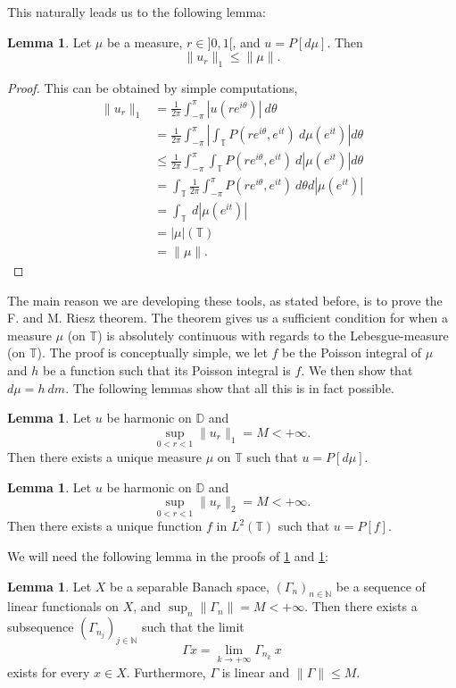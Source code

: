 \documentclass[a4paper,12pt,twoside,BCOR=10mm]{scrbook}
\theoremstyle{definition}
\theoremstyle{definition}
\newtheorem{lemma}[theorem]{Lemma}
\theoremstyle{definition}
\begin{document}
This naturally leads us to the following lemma:
\begin{lemma}
\label{FMRlemma1}
Let $\mu$ be a measure, $r \in ]0, 1[$, and $u = P[d\mu]$.
Then
\[
	\|u_r\|_1 \leq \|\mu\|.
\]
\end{lemma}
\begin{proof}
This can be obtained by simple computations,
\begin{align*}
	\|u_r\|_1
	&= \frac{1}{2\pi} \int_{-\pi}^{\pi} |u(re^{i\theta})|\ d\theta\\
	&= \frac{1}{2\pi} \int_{-\pi}^{\pi} \left | \int_{\mathbb{T}} P(re^{i\theta}, e^{it})\ d\mu(e^{it}) \right | d\theta\\
	&\leq \frac{1}{2\pi} \int_{-\pi}^{\pi} \int_{\mathbb{T}} P(re^{i\theta}, e^{it})\ d|\mu(e^{it})| d\theta\\
	&= \int_{\mathbb{T}} \frac{1}{2\pi} \int_{-\pi}^{\pi} P(re^{i\theta}, e^{it})\ d\theta d|\mu(e^{it})|\\ 
	&= \int_{\mathbb{T}}\ d|\mu(e^{it})|\\
	&= |\mu|(\mathbb{T})\\
	&= \|\mu\|.
\end{align*}
\end{proof}
The main reason we are developing these tools, as stated before, is to prove the F. and M. Riesz theorem.
The theorem gives us a sufficient condition for when a measure $\mu$ (on $\mathbb{T}$) is absolutely continuous with regards to the Lebesgue-measure (on $\mathbb{T}$).
The proof is conceptually simple, we let $f$ be the Poisson integral of $\mu$ and $h$ be a function such that its Poisson integral is $f$.
We then show that $d\mu = h\ dm$. %
The following lemmas show that all this is in fact possible.
\begin{lemma}
\label{FMRlemma3}
Let $u$ be harmonic on $\mathbb{D}$ and
\[
	\sup_{0 < r < 1} \|u_r\|_1 = M < +\infty.
\]
Then there exists a unique measure $\mu$ on $\mathbb{T}$ such that $u = P[d\mu]$.
\end{lemma}
\begin{lemma}
\label{FMRlemma3b}
Let $u$ be harmonic on $\mathbb{D}$ and
\[
	\sup_{0 < r < 1} \|u_r\|_2 = M < +\infty.
\]
Then there exists a unique function $f$ in $L^2(\mathbb{T})$ such that $u = P[f]$.
\end{lemma}
We will need the following lemma in the proofs of \ref{FMRlemma3} and \ref{FMRlemma3b}:
\begin{lemma}
\label{FMRlemma31}
Let $X$ be a separable Banach space,
	$(\Gamma_n)_{n \in \mathbb{N}}$ be a sequence of linear functionals on $X$,
	and $\sup_n \|\Gamma_n\| = M < +\infty$.
Then there exists a subsequence $(\Gamma_{n_j})_{j \in \mathbb{N}}$ such that the limit 
\[
	\Gamma x = \lim_{k \rightarrow +\infty} \Gamma_{n_k}\ x
\]
exists for every $x \in X$.
Furthermore, $\Gamma$ is linear and $\|\Gamma\| \leq M$.
\end{lemma}
\end{document}
